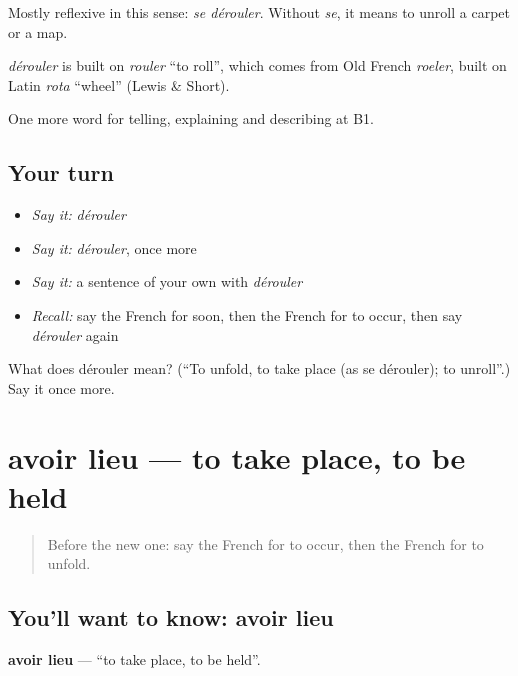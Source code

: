 Mostly reflexive in this sense: \emph{se dérouler}. Without \emph{se}, it means to unroll a carpet or a map.

\begin{cousinweb}
\emph{dérouler} is built on \emph{rouler} \textquotedblleft{}to roll\textquotedblright{}, which comes from Old French \emph{roeler}, built on Latin \emph{rota} \textquotedblleft{}wheel\textquotedblright{} (Lewis \& Short).
\end{cousinweb}

\begin{grammarlens}[title={What you've built}]
One more word for telling, explaining and describing at B1.
\end{grammarlens}

\subsection*{Your turn}
\begin{itemize}
\raggedright
  \item \emph{Say it:} \emph{dérouler}
  \item \emph{Say it:} \emph{dérouler}, once more
  \item \emph{Say it:} a sentence of your own with \emph{dérouler}
  \item \emph{Recall:} say the French for soon, then the French for to occur, then say \emph{dérouler} again
\end{itemize}

\begin{tcolorbox}[breakable,colback=teal!4,colframe=teal!35!black,title={Before you move on}]
What does dérouler mean? (\textquotedblleft{}To unfold, to take place (as se dérouler); to unroll\textquotedblright{}.) Say it once more.
\end{tcolorbox}
\section[avoir lieu]{avoir lieu — to take place, to be held}

\label{lesson:FR-C274-avoir-lieu}



\begin{quote}
Before the new one: say the French for to occur, then the French for to unfold.
\end{quote}

\subsection*{You'll want to know: avoir lieu}
\textbf{avoir lieu} — \textquotedblleft{}to take place, to be held\textquotedblright{}.

